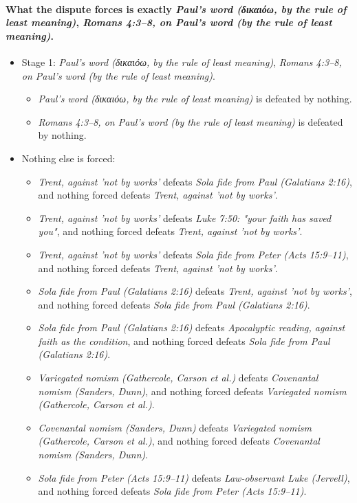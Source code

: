 \documentclass[11pt]{article}
\begin{document}
\paragraph{What the dispute forces is exactly \emph{Paul's word (δικαιόω, by the rule of least meaning)}, \emph{Romans 4:3–8, on Paul's word (by the rule of least meaning)}.}
\begin{itemize}
\item Stage 1: \emph{Paul's word (δικαιόω, by the rule of least meaning)}, \emph{Romans 4:3–8, on Paul's word (by the rule of least meaning)}.
\begin{itemize}
\item \emph{Paul's word (δικαιόω, by the rule of least meaning)} is defeated by nothing.
\item \emph{Romans 4:3–8, on Paul's word (by the rule of least meaning)} is defeated by nothing.
\end{itemize}
\item Nothing else is forced:
\begin{itemize}
\item \emph{Trent, against 'not by works'} defeats \emph{Sola fide from Paul (Galatians 2:16)}, and nothing forced defeats \emph{Trent, against 'not by works'}.
\item \emph{Trent, against 'not by works'} defeats \emph{Luke 7:50: "your faith has saved you"}, and nothing forced defeats \emph{Trent, against 'not by works'}.
\item \emph{Trent, against 'not by works'} defeats \emph{Sola fide from Peter (Acts 15:9–11)}, and nothing forced defeats \emph{Trent, against 'not by works'}.
\item \emph{Sola fide from Paul (Galatians 2:16)} defeats \emph{Trent, against 'not by works'}, and nothing forced defeats \emph{Sola fide from Paul (Galatians 2:16)}.
\item \emph{Sola fide from Paul (Galatians 2:16)} defeats \emph{Apocalyptic reading, against faith as the condition}, and nothing forced defeats \emph{Sola fide from Paul (Galatians 2:16)}.
\item \emph{Variegated nomism (Gathercole, Carson et al.)} defeats \emph{Covenantal nomism (Sanders, Dunn)}, and nothing forced defeats \emph{Variegated nomism (Gathercole, Carson et al.)}.
\item \emph{Covenantal nomism (Sanders, Dunn)} defeats \emph{Variegated nomism (Gathercole, Carson et al.)}, and nothing forced defeats \emph{Covenantal nomism (Sanders, Dunn)}.
\item \emph{Sola fide from Peter (Acts 15:9–11)} defeats \emph{Law-observant Luke (Jervell)}, and nothing forced defeats \emph{Sola fide from Peter (Acts 15:9–11)}.

\end{itemize}
\end{itemize}
\end{document}
